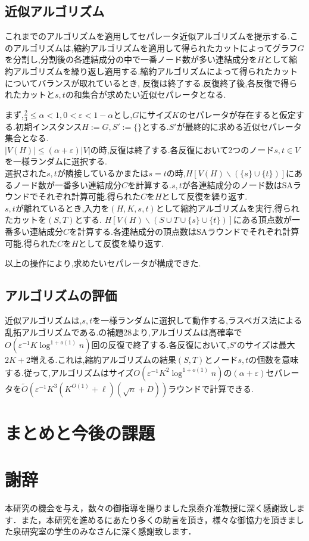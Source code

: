 \documentclass{thesis}
\theoremstyle{definition}
\begin{document}
\section{近似アルゴリズム}
これまでのアルゴリズムを適用してセパレータ近似アルゴリズムを提示する.このアルゴリズムは,縮約アルゴリズムを適用して得られたカットによってグラフ$G$を分割し,分割後の各連結成分の中で一番ノード数が多い連結成分を$H$として縮約アルゴリズムを繰り返し適用する.縮約アルゴリズムによって得られたカットについてバランスが取れているとき, 反復は終了する.反復終了後,各反復で得られたカットと$s,t$の和集合が求めたい近似セパレータとなる.\par
まず,$\frac{2}{3} \leq \alpha < 1,0 < \varepsilon < 1-\alpha$とし,$G$にサイズ$K$のセパレータが存在すると仮定する.初期インスタンス$H:=G,S':= \{\}$とする.$S'$が最終的に求める近似セパレータ集合となる.\\
$|V(H)|\leq (\alpha + \varepsilon)|V|$の時,反復は終了する.各反復において2つのノード$s,t \in V$を一様ランダムに選択する.\\
選択された$s,t$が隣接しているかまたは$s = t$の時,$H[V(H) \backslash (\{s\} \cup \{t\})]$にあるノード数が一番多い連結成分$C$を計算する.$s,t$が各連結成分のノード数はSAラウンドでそれぞれ計算可能.得られた$C$を$H$として反復を繰り返す.\\
$s,t$が離れているとき,入力を$(H,K,s,t)$として縮約アルゴリズムを実行,得られたカットを$(S,T)$とする.
$H[V(H) \backslash (S \cup T \cup \{s\} \cup \{t\})]$にある頂点数が一番多い連結成分$C$を計算する.各連結成分の頂点数はSAラウンドでそれぞれ計算可能.得られた$C$を$H$として反復を繰り返す.\par
以上の操作により,求めたいセパレータが構成できた.

\section{アルゴリズムの評価}
近似アルゴリズムは,$s,t$を一様ランダムに選択して動作する,ラスベガス法による乱拓アルゴリズムである.\cite{brandt2017approximating}の補題28より,アルゴリズムは高確率で$O(\varepsilon^{-1}K\log^{1+o(1)}n)$回の反復で終了する.各反復において,$S'$のサイズは最大$2K+2$増える.これは,縮約アルゴリズムの結果$(S,T)$とノード$s,t$の個数を意味する.従って,アルゴリズムはサイズ$O(\varepsilon^{-1}K^2\log^{1+o(1)}n)$の$(\alpha + \varepsilon)$セパレータを$\tilde{O}(\varepsilon^{-1}K^3(K^{O(1)}+\ell)(\sqrt{n}+D))$ラウンドで計算できる.

\chapter{まとめと今後の課題}

\chapter{謝辞}
本研究の機会を与え，数々の御指導を賜りました泉泰介准教授に深く感謝致します．また，本研究を進めるにあたり多くの助言を頂き，様々な御協力を頂きました泉研究室の学生のみなさんに深く感謝致します．




%
\end{document}

